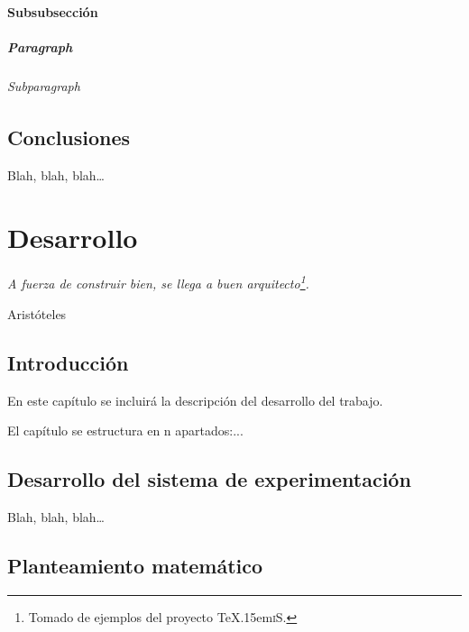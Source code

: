 \documentclass[spanish,openright]{book}
\def\texis{\TeX \raise.15em\hbox{\textsc{i}}S}
\newenvironment{FraseCelebre}{\begin{list}{}{\setlength{\leftmargin}{0.5\textwidth}\setlength{\parsep}{0cm}\addtolength{\topsep}{0.5cm}}
  }
  {\unskip \end{list}}
\newenvironment{Frase}{\item \begin{flushright}\small\em}{\end{flushright}}
\newenvironment{Fuente}{\item \begin{flushright}\small}{\end{flushright}}
\begin{document}
\subsubsection{Subsubsección}
\label{sec:subsubseccion}

\paragraph{Paragraph}
\label{sec:paragraph-1}


\subparagraph{Subparagraph}
\label{sec:subparagraph}



\section{Conclusiones}
\label{sec:conclusiones-teoria}

Blah, blah, blah\ldots

 


\chapter{Desarrollo}
\label{cha:desarrollo}


\begin{FraseCelebre}
  \begin{Frase}
    A fuerza de construir bien, se llega a buen
    arquitecto\footnote{Tomado de ejemplos del proyecto \texis{}.}.
  \end{Frase}
  \begin{Fuente}
    Aristóteles
  \end{Fuente}
\end{FraseCelebre}

\section{Introducción}
\label{sec:introduccion-desarrollo}

En este capítulo se incluirá la descripción del desarrollo del trabajo.

El capítulo se estructura en n apartados:...


\section{Desarrollo del sistema de experimentación}
\label{sec:desarr-del-sist}

Blah, blah, blah\ldots


\section{Planteamiento matemático}
\label{sec:libr-desarr}
\end{document}
